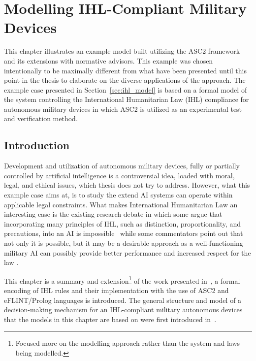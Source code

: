 \chapter{Modelling IHL-Compliant Military Devices}

This chapter illustrates an example model built utilizing the ASC2 framework and its extensions with normative advisors. This example was chosen intentionally to be maximally different from what have been presented until this point in the thesis to elaborate on the diverse applications of the approach. The example case presented in Section~\ref{sec:ihl_model} is based on a formal model of the system controlling the International Humanitarian Law (IHL) compliance for autonomous military devices in which ASC2 is utilized as an experimental test and verification method.%


\section{Introduction}
Development and utilization of autonomous military devices, fully or partially controlled by artificial intelligence is a controversial idea, loaded with moral, legal, and ethical issues, which thesis does not try to address. However, what this example case aims at, is to study the extend AI systems can operate within applicable legal constraints. What makes International Humanitarian Law an interesting case is the existing research debate in which some argue that incorporating many principles of IHL, such as distinction, proportionality, and precautions, into an AI is impossible~\cite{115CrootofRcrdz,120Szpak} while some commentators point out that not only it is possible, but it may be a desirable approach as a well-functioning military AI can possibly provide better performance and increased respect for the law \cite{119DoDaiprinc,119NeyPCIslKeynt}.

This chapter is a summary and extension\footnote{Focused more on the modelling approach rather than the system and laws being modelled.} of the work presented in~\cite{zurek2022jurix}, a formal encoding of IHL rules and their implementation with the use of ASC2 and eFLINT/Prolog languages is introduced. The general structure and model of a decision-making mechanism for an IHL-compliant military autonomous devices that the models in this chapter are based on were first introduced in~\cite{zurek-coine22}.

